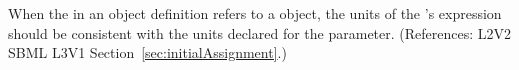 When the  in an \InitialAssignment object definition refers
to a \Parameter object, the units of the \InitialAssignment's 
expression should be consistent with the units declared for the parameter.
(References: L2V2 SBML L3V1 Section~\ref{sec:initialAssignment}.)
